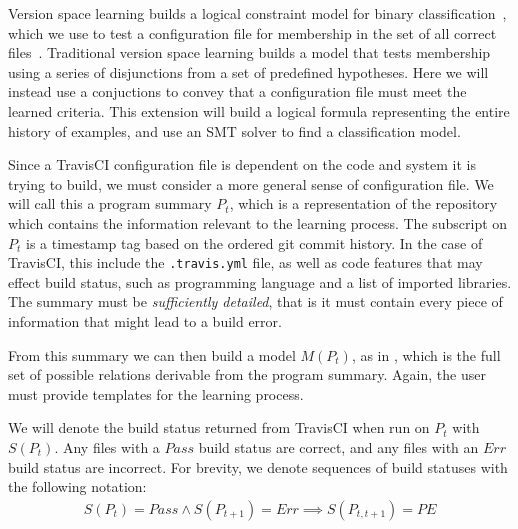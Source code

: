 Version space learning builds a logical constraint model for binary
classification~\cite{mitchell77}, which we use to test a configuration file for membership
in the set of all correct files~.
Traditional version space learning builds a model that tests membership
using a series of disjunctions from a set of predefined hypotheses.
Here we will instead use a conjuctions to convey that a configuration file must meet the learned criteria.
This extension will build a logical formula representing the entire 
history of examples, and use an SMT solver to find a classification model.

Since a TravisCI configuration file is dependent
on the code and system it is trying to build, 
we must consider a more general sense of configuration file.
We will call this a program summary $P_t$, which is a representation 
of the repository which contains the information 
relevant to the learning process.
The subscript on $P_t$ is a timestamp tag based on 
the ordered git commit history.
In the case of TravisCI, this include the \verb|.travis.yml| file, 
as well as code features that may effect build status, 
such as programming language and a list of imported libraries.
The summary must be \textit{sufficiently detailed}, that is it must contain every piece of information that might lead to a build error.


From this summary we can then build a model $M(P_t)$, as in \app,
which is the full set of possible relations derivable 
from the program summary.
Again, the user must provide templates for the learning process.

We will denote the build status returned from TravisCI when run on $P_t$ with $S(P_t)$.
Any files with a $Pass$ build status are correct, and any files with an $Err$ build status are incorrect.
For brevity, we denote sequences of build statuses with the following notation:
\begin{align*}
  S(P_t)=Pass \land S(P_{t+1})=Err \implies S(P_{t,t+1}) = PE
\end{align*}

